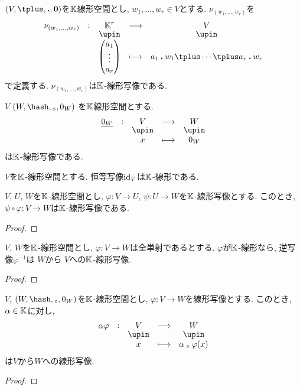 \begin{example}
  $(V,\plus,\act,\zzero)$を$\mathbb{K}$線形空間とし,
  $w_1,\ldots,w_r\in V$とする.
  $\nu_{(w_1,\ldots,w_r)}$を
    \begin{align*}
      \shazo{\nu_{(w_1,\ldots,w_r)}}{\KK^r}{V}
      {\begin{pmatrix}a_1\\\vdots\\a_r\end{pmatrix}}{a_1\act w_1\plus\cdots\plus a_r\act w_r}
    \end{align*}
    で定義する.
  $\nu_{(w_1,\ldots,w_r)}$は$\mathbb{K}$-線形写像である.
\end{example}

\begin{example}
  $V$
  $(W,\pplus,\aact,0_W)$
  を$\mathbb{K}$線形空間とする.
    \begin{align*}
      \shazo{\underline{0_W}}{V}{W}
      {x}{0_W}
    \end{align*}
  は$\mathbb{K}$-線形写像である.
\end{example}


\begin{example}
  $V$を$\mathbb{K}$-線形空間とする.
  恒等写像$\operatorname{id}_V$は$\mathbb{K}$-線形である.
\end{example}



\begin{example}
  $V$, $U$, $W$を$\mathbb{K}$-線形空間とし,
  $\varphi\colon V\to U$,
  $\psi\colon U\to W$を$\mathbb{K}$-線形写像とする.
  このとき, $\psi\circ\varphi\colon V\to W$は$\mathbb{K}$-線形写像である.
\end{example}
\begin{proof}\end{proof}

\begin{example}
  $V$, $W$を$\mathbb{K}$-線形空間とし,
  $\varphi\colon V\to W$は全単射であるとする.
  $\varphi$が$\mathbb{K}$-線形なら,
  逆写像$\varphi^{-1}$は
  $W$から
  $V$への$\mathbb{K}$-線形写像.
\end{example}
\begin{proof}\end{proof}

\begin{example}
  $V$, $(W,\pplus,\aact,0_W)$を$\mathbb{K}$-線形空間とし,
  $\varphi\colon V\to W$を線形写像とする.
  このとき, $\alpha \in \mathbb{K}$に対し,
  \begin{align*}
  \shazo{\alpha\varphi}{V}{W}
  {x}{\alpha\aact \varphi(x)}
  \end{align*}
  は$V$から$W$への線形写像.
\end{example}
\begin{proof}\end{proof}

